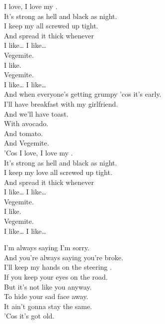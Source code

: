 I love, I love my . \\
It's strong as hell and black as night. \\
I keep my  all screwed up tight. \\
And spread it thick whenever \\
I like… I like… \\

Vegemite. \\
I like. \\
Vegemite. \\
I like… I like… \\

And when everyone's getting grumpy 'cos it's early. \\
I'll have breakfast with my girlfriend. \\
And we'll have toast. \\
With avocado. \\
And tomato. \\
And Vegemite. \\

'Cos I love, I love my . \\
It's strong as hell and black as night. \\
I keep my love all screwed up tight. \\
And spread it thick whenever \\
I like… I like… \\

Vegemite. \\
I like. \\
Vegemite. \\
I like… I like… \\





I'm always saying I'm sorry. \\
And you're always saying you're broke. \\
I'll keep my hands on the steering . \\
If you keep your eyes on the road. \\
But it's not like you anyway. \\
To hide your sad face away. \\
It ain't gonna stay the same. \\
'Cos it's got old. \\

